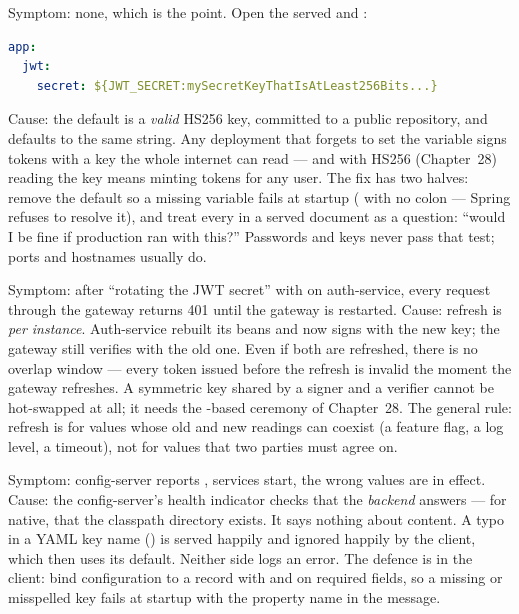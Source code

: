 \begin{pitfall}
Symptom: none, which is the point. Open the served
 and :
\begin{lstlisting}[language=yaml]
app:
  jwt:
    secret: ${JWT_SECRET:mySecretKeyThatIsAtLeast256Bits...}
\end{lstlisting}
Cause: the default is a \emph{valid} HS256 key, committed to a public
repository, and  defaults  to
the same string. Any deployment that forgets to set the variable signs
tokens with a key the whole internet can read --- and with HS256
(Chapter~28) reading the key means minting tokens for any user. The
fix has two halves: remove the default so a missing variable fails at
startup ( with no colon --- Spring refuses to
resolve it), and treat every  in a served document
as a question: ``would I be fine if production ran with this?''
Passwords and keys never pass that test; ports and hostnames usually do.
\end{pitfall}

\begin{pitfall}
Symptom: after ``rotating the JWT secret'' with  on auth-service, every request through the gateway
returns 401 until the gateway is restarted. Cause: refresh is
\emph{per instance}. Auth-service rebuilt its 
beans and now signs with the new key; the gateway still verifies with
the old one. Even if both are refreshed, there is no overlap window ---
every token issued before the refresh is invalid the moment the
gateway refreshes. A symmetric key shared by a signer and a verifier
cannot be hot-swapped at all; it needs the -based ceremony
of Chapter~28. The general rule: refresh is for values whose old and new
readings can coexist (a feature flag, a log level, a timeout), not for
values that two parties must agree on.
\end{pitfall}

\begin{pitfall}
Symptom: config-server reports , services start, the wrong
values are in effect. Cause: the config-server's health indicator
checks that the \emph{backend} answers --- for native, that the
classpath directory exists. It says nothing about content. A typo in a
YAML key name () is served happily and ignored happily
by the client, which then uses its default. Neither side logs an error.
The defence is in the client: bind configuration to a
 record with
 and  on required fields, so a missing
or misspelled key fails at startup with the property name in the
message.
\end{pitfall}

